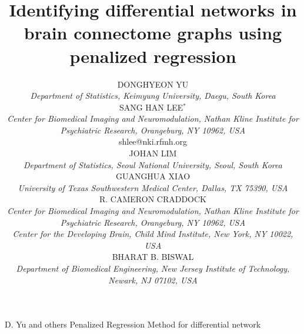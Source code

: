 \documentclass[useAMS,usenatbib,referee]{bio}
\begin{document}
\title{Identifying differential networks in brain connectome graphs using penalized regression}


\author{DONGHYEON YU\\[2pt] 
\textit{Department of Statistics, Keimyung University, Daegu, South Korea}
\\[2pt]
SANG HAN LEE$^{\ast}$\\ [2pt]
\textit{ 
 Center for Biomedical Imaging and Neuromodulation, Nathan Kline Institute for Psychiatric Research, Orangeburg, NY 10962, USA}
\\[2pt]
{shlee@nki.rfmh.org}\\[2pt]
JOHAN LIM \\[2pt]
\textit{Department of Statistics, Seoul National University, Seoul, South Korea} \\[2pt]
GUANGHUA XIAO\\[2pt]
\textit{ 
University of Texas Southwestern Medical Center, Dallas, TX 75390, USA}
\\[2pt]
R. CAMERON CRADDOCK\\ [2pt]
\textit{ 
Center for Biomedical Imaging and Neuromodulation, Nathan Kline Institute for Psychiatric Research, Orangeburg, NY 10962, USA\\
Center for the Developing Brain, Child Mind Institute, New York, NY 10022, USA}
\\[2pt]
BHARAT B. BISWAL  \\[2pt]
\textit{ 
Department of Biomedical Engineering, New Jersey Institute of Technology, Newark, NJ 07102, USA
}
\\[2pt]
}

\markboth%
{D. Yu and others}
{Penalized Regression Method for differential network}

\maketitle

\end{document}
